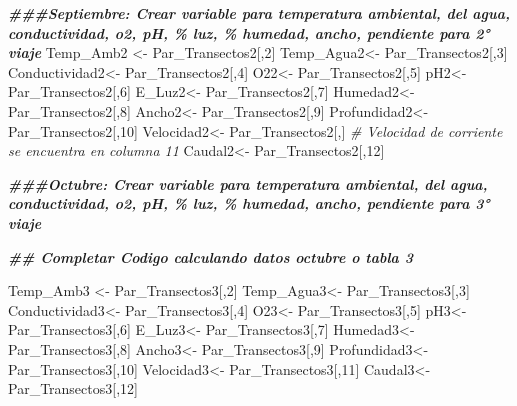 \documentclass[
]{article}
\newenvironment{Shaded}{\begin{snugshade}}{\end{snugshade}}
\newcommand{\CommentTok}[1]{\textcolor[rgb]{0.56,0.35,0.01}{\textit{#1}}}
\newcommand{\DecValTok}[1]{\textcolor[rgb]{0.00,0.00,0.81}{#1}}
\newcommand{\DocumentationTok}[1]{\textcolor[rgb]{0.56,0.35,0.01}{\textbf{\textit{#1}}}}
\newcommand{\NormalTok}[1]{#1}
\newcommand{\OtherTok}[1]{\textcolor[rgb]{0.56,0.35,0.01}{#1}}
\begin{document}
\begin{Shaded}
\begin{Highlighting}[]
\DocumentationTok{\#\#\#Septiembre: Crear variable para temperatura ambiental, del agua, conductividad, o2, pH, \% luz, \% humedad, ancho, pendiente para 2° viaje}
\NormalTok{Temp\_Amb2 }\OtherTok{\textless{}{-}}\NormalTok{ Par\_Transectos2[,}\DecValTok{2}\NormalTok{]}
\NormalTok{Temp\_Agua2}\OtherTok{\textless{}{-}}\NormalTok{ Par\_Transectos2[,}\DecValTok{3}\NormalTok{]}
\NormalTok{Conductividad2}\OtherTok{\textless{}{-}}\NormalTok{ Par\_Transectos2[,}\DecValTok{4}\NormalTok{]}
\NormalTok{O22}\OtherTok{\textless{}{-}}\NormalTok{ Par\_Transectos2[,}\DecValTok{5}\NormalTok{]}
\NormalTok{pH2}\OtherTok{\textless{}{-}}\NormalTok{ Par\_Transectos2[,}\DecValTok{6}\NormalTok{]}
\NormalTok{E\_Luz2}\OtherTok{\textless{}{-}}\NormalTok{ Par\_Transectos2[,}\DecValTok{7}\NormalTok{]}
\NormalTok{Humedad2}\OtherTok{\textless{}{-}}\NormalTok{ Par\_Transectos2[,}\DecValTok{8}\NormalTok{]}
\NormalTok{Ancho2}\OtherTok{\textless{}{-}}\NormalTok{ Par\_Transectos2[,}\DecValTok{9}\NormalTok{]}
\NormalTok{Profundidad2}\OtherTok{\textless{}{-}}\NormalTok{ Par\_Transectos2[,}\DecValTok{10}\NormalTok{]}
\NormalTok{Velocidad2}\OtherTok{\textless{}{-}}\NormalTok{ Par\_Transectos2[,] }\CommentTok{\# Velocidad de corriente se encuentra en columna 11}
\NormalTok{Caudal2}\OtherTok{\textless{}{-}}\NormalTok{ Par\_Transectos2[,}\DecValTok{12}\NormalTok{]}

\DocumentationTok{\#\#\#Octubre: Crear variable para temperatura ambiental, del agua, conductividad, o2, pH, \% luz, \% humedad, ancho, pendiente para 3° viaje}

\DocumentationTok{\#\# Completar Codigo calculando datos octubre o tabla 3}
  
\NormalTok{Temp\_Amb3 }\OtherTok{\textless{}{-}}\NormalTok{ Par\_Transectos3[,}\DecValTok{2}\NormalTok{]}
\NormalTok{Temp\_Agua3}\OtherTok{\textless{}{-}}\NormalTok{ Par\_Transectos3[,}\DecValTok{3}\NormalTok{]}
\NormalTok{Conductividad3}\OtherTok{\textless{}{-}}\NormalTok{ Par\_Transectos3[,}\DecValTok{4}\NormalTok{]}
\NormalTok{O23}\OtherTok{\textless{}{-}}\NormalTok{ Par\_Transectos3[,}\DecValTok{5}\NormalTok{]}
\NormalTok{pH3}\OtherTok{\textless{}{-}}\NormalTok{ Par\_Transectos3[,}\DecValTok{6}\NormalTok{]}
\NormalTok{E\_Luz3}\OtherTok{\textless{}{-}}\NormalTok{ Par\_Transectos3[,}\DecValTok{7}\NormalTok{]}
\NormalTok{Humedad3}\OtherTok{\textless{}{-}}\NormalTok{ Par\_Transectos3[,}\DecValTok{8}\NormalTok{]}
\NormalTok{Ancho3}\OtherTok{\textless{}{-}}\NormalTok{ Par\_Transectos3[,}\DecValTok{9}\NormalTok{]}
\NormalTok{Profundidad3}\OtherTok{\textless{}{-}}\NormalTok{ Par\_Transectos3[,}\DecValTok{10}\NormalTok{]}
\NormalTok{Velocidad3}\OtherTok{\textless{}{-}}\NormalTok{ Par\_Transectos3[,}\DecValTok{11}\NormalTok{] }
\NormalTok{Caudal3}\OtherTok{\textless{}{-}}\NormalTok{ Par\_Transectos3[,}\DecValTok{12}\NormalTok{]}




\end{Highlighting}
\end{Shaded}
\end{document}
